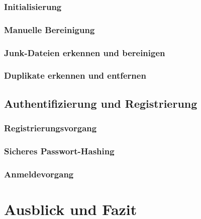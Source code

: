 \documentclass[12pt,a4paper]{article}
\begin{document}
\subsubsection{Initialisierung}


\subsubsection{Manuelle Bereinigung}


\subsubsection{Junk-Dateien erkennen und bereinigen}


\subsubsection{Duplikate erkennen und entfernen}



\subsection{Authentifizierung und Registrierung}


\subsubsection{Registrierungsvorgang}


\subsubsection{Sicheres Passwort-Hashing}


\subsubsection{Anmeldevorgang}


\clearpage

\section{Ausblick und Fazit}





\end{document}
